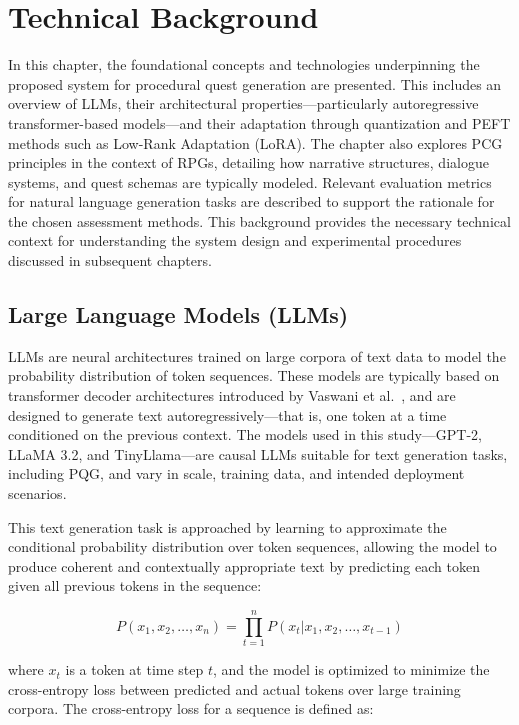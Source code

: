 \clearpage

\chapter{Technical Background}

In this chapter, the foundational concepts and technologies underpinning the proposed system for procedural
quest generation are presented. This includes an overview of
LLMs, their architectural properties—particularly autoregressive transformer-based models—and
their adaptation through quantization and PEFT methods such as Low-Rank
Adaptation (LoRA). The chapter also explores PCG principles in the context of RPGs,
detailing how narrative structures, dialogue systems, and quest schemas are typically
modeled. Relevant evaluation metrics for natural language generation tasks are described
to support the rationale for the chosen assessment methods. This background provides
the necessary technical context for understanding the system design and experimental
procedures discussed in subsequent chapters.

\section{Large Language Models (LLMs)}

LLMs are neural architectures trained on large corpora of text data to model the probability
distribution of token sequences. These models are typically based on transformer
decoder architectures introduced by Vaswani et al.~\cite{vaswani2017attention}, and are designed to generate text
autoregressively—that is, one token at a time conditioned on the previous context. The
models used in this study—GPT-2, LLaMA 3.2, and TinyLlama—are causal LLMs suitable
for text generation tasks, including PQG, and vary in scale, training data, and
intended deployment scenarios.

This text generation task is approached by learning to approximate the conditional
probability distribution over token sequences, allowing the model to produce coherent and
contextually appropriate text by predicting each token given all previous tokens in the
sequence:

\begin{equation}
  P(x_1, x_2, \dots, x_n) = \prod_{t=1}^n P(x_t | x_1, x_2, \dots, x_{t-1})
  \label{tokengen}
\end{equation}

where $x_t$ is a token at time step $t$, and the model is optimized to minimize the cross-entropy
loss between predicted and actual tokens over large training corpora. The cross-entropy
loss for a sequence is defined as:

